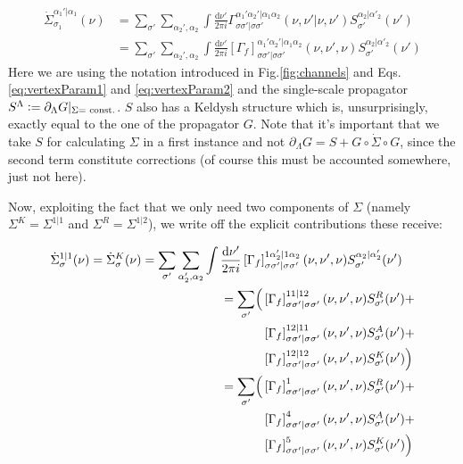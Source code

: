 \documentclass[12pt,a4paper,roman]{article}
\newcommand{\defeq}{\vcentcolon=}
\newcommand{\dd}{\mathrm{d}}
\begin{document}
\begin{align}
\dot{\Sigma}^{\alpha_1'|\alpha_1}_{\sigma_1}(\nu) &= \sum_{\sigma'} \sum_{\alpha_2', \alpha_2} \int \frac{\dd\nu'}{2\pi i}  \Gamma_{\sigma\sigma'|\sigma\sigma'}^{\alpha_1'\alpha_2'|\alpha_1\alpha_2}(\nu, \nu'| \nu, \nu')S^{\alpha_2|\alpha'_2}_{\sigma'}(\nu')\\
&= \sum_{\sigma'} \sum_{\alpha_2', \alpha_2} \int \frac{\dd\nu'}{2\pi i}  \left[\Gamma_f\right]_{\sigma\sigma'|\sigma\sigma'}^{\alpha_1'\alpha_2'|\alpha_1\alpha_2}(\nu, \nu', \nu)S^{\alpha_2|\alpha'_2}_{\sigma'}(\nu')
\label{eq:derivativeSelfEnergy}
\end{align}
Here we are using the notation introduced in Fig.\ref{fig:channels} and Eqs.\eqref{eq:vertexParam1} and \eqref{eq:vertexParam2} and the single-scale propagator $S^\Lambda \defeq \partial_\Lambda G|_{\Sigma =\text{ const.}}$. $S$ also has a Keldysh structure which is, unsurprisingly, exactly equal to the one of the propagator $G$. Note that it's important that we take $S$ for calculating $\Sigma$ in a first instance and not $\partial_\Lambda G = S + G\circ \dot{\Sigma}\circ G$, since the second term constitute corrections (of course this must be accounted somewhere, just not here).

Now, exploiting the fact that we only need two components of $\Sigma$ (namely $\Sigma^K=\Sigma^{1|1}$ and $\Sigma^R=\Sigma^{1|2}$), we write off the explicit contributions these receive:

\begin{align}
\begin{split}
\dot{\Sigma}^{1|1}_\sigma(\nu) =\dot{\Sigma}^K_\sigma(\nu) = \sum_{\sigma'}&\sum_{\alpha_2', \alpha_2}\int \frac{\dd\nu'}{2\pi i} \left[\Gamma_f\right]_{\sigma\sigma'|\sigma\sigma'}^{1\alpha_2'|1\alpha_2}(\nu, \nu', \nu)S^{\alpha_2|\alpha_2'}_{\sigma'}(\nu')
\end{split}\\
\begin{split}
= \sum_{\sigma'} \Bigl(
&\left[\Gamma_f\right]_{\sigma\sigma'|\sigma\sigma'}^{11|12}(\nu, \nu', \nu)S^R_{\sigma'}(\nu') +\\
&\left[\Gamma_f\right]_{\sigma\sigma'|\sigma\sigma'}^{12|11}(\nu, \nu', \nu)S^A_{\sigma'}(\nu') +\\
& \left[\Gamma_f\right]_{\sigma\sigma'|\sigma\sigma'}^{12|12}(\nu, \nu', \nu)S^K_{\sigma'}(\nu')\Bigr)
\end{split}\\
\begin{split}
= \sum_{\sigma'} \Bigl(
&\left[\Gamma_f\right]_{\sigma\sigma'|\sigma\sigma'}^{1}(\nu, \nu', \nu)S^R_{\sigma'}(\nu') +\\
&\left[\Gamma_f\right]_{\sigma\sigma'|\sigma\sigma'}^{4}(\nu, \nu', \nu)S^A_{\sigma'}(\nu') +\\
& \left[\Gamma_f\right]_{\sigma\sigma'|\sigma\sigma'}^{5}(\nu, \nu', \nu)S^K_{\sigma'}(\nu')\Bigr)
\label{eq:SigmaK}
\end{split}
\end{align}
\end{document}
